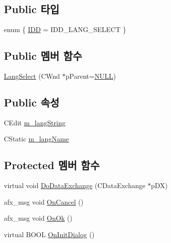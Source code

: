 \subsection*{Public 타입}
\begin{DoxyCompactItemize}
\item 
enum \{ \mbox{\hyperlink{class_lang_select_af4e6d80a5f0f0e069d0e56b265244d4da5bc96450a48a899892ede71c87113aa3}{I\+DD}} = I\+D\+D\+\_\+\+L\+A\+N\+G\+\_\+\+S\+E\+L\+E\+CT
 \}
\end{DoxyCompactItemize}
\subsection*{Public 멤버 함수}
\begin{DoxyCompactItemize}
\item 
\mbox{\hyperlink{class_lang_select_a87e6124e69b3969d3f1494751c08af6e}{Lang\+Select}} (C\+Wnd $\ast$p\+Parent=\mbox{\hyperlink{_system_8h_a070d2ce7b6bb7e5c05602aa8c308d0c4}{N\+U\+LL}})
\end{DoxyCompactItemize}
\subsection*{Public 속성}
\begin{DoxyCompactItemize}
\item 
C\+Edit \mbox{\hyperlink{class_lang_select_af75ddf60623799cb4c761692a8057b46}{m\+\_\+lang\+String}}
\item 
C\+Static \mbox{\hyperlink{class_lang_select_ab18b546f12c8230292959ce2258ef240}{m\+\_\+lang\+Name}}
\end{DoxyCompactItemize}
\subsection*{Protected 멤버 함수}
\begin{DoxyCompactItemize}
\item 
virtual void \mbox{\hyperlink{class_lang_select_aed6d5a0a1a5ffc02ac08f06cade9169a}{Do\+Data\+Exchange}} (C\+Data\+Exchange $\ast$p\+DX)
\item 
afx\+\_\+msg void \mbox{\hyperlink{class_lang_select_af77cabdf85041273c5b6da89cb92508c}{On\+Cancel}} ()
\item 
afx\+\_\+msg void \mbox{\hyperlink{class_lang_select_ad10c9461cc371d496c41ede46c64c35e}{On\+Ok}} ()
\item 
virtual B\+O\+OL \mbox{\hyperlink{class_lang_select_ab98f0d9a2302d971a9430c921fc52f8b}{On\+Init\+Dialog}} ()
\end{DoxyCompactItemize}


